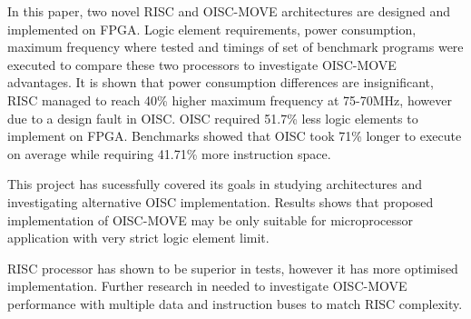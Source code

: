\iffalse
The final chapter is short and sweet, to the point:
 what did you really accomplish? 
 What significant result can you claim and how it differs from anything done before. 
 How well did you meet your goal? 
 Now step out one level, then another indicating the impact your work will have on the literature and on future endeavours.
 * Start with the specifics and end with the general.
 * Summarise key result; mention limitations, note anything unexpected.
\fi

In this paper, two novel RISC and OISC-MOVE architectures are designed and implemented on FPGA. Logic element requirements, power consumption, maximum frequency where tested and timings of set of benchmark programs were executed to compare these two processors to investigate OISC-MOVE advantages. It is shown that power consumption differences are insignificant, RISC managed to reach 40\% higher maximum frequency at 75-70MHz, however due to a design fault in OISC. OISC required 51.7\% less logic elements to implement on FPGA. Benchmarks showed that OISC took 71\% longer to execute on average while requiring 41.71\% more instruction space. 

This project has sucessfully covered its goals in studying architectures and investigating alternative OISC implementation. Results shows that proposed implementation of OISC-MOVE may be only suitable for microprocessor application with very strict logic element limit. 

RISC processor has shown to be superior in tests, however it has more optimised implementation. Further research in needed to investigate OISC-MOVE performance with multiple data and instruction buses to match RISC complexity. 
